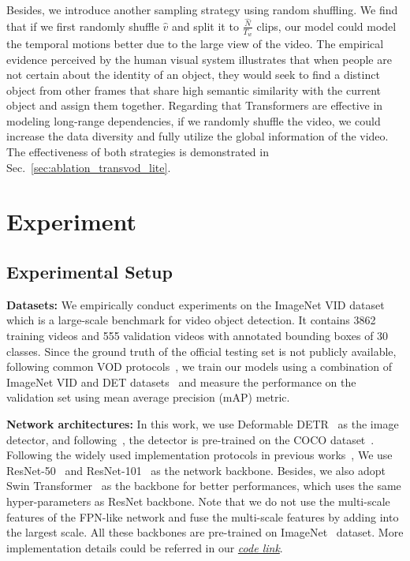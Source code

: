 \documentclass[10pt,journal,compsoc]{IEEEtran}
\begin{document}
Besides, we introduce another sampling strategy using random shuffling.
We find that if we first randomly shuffle $\hat{v}$ and split it to $\frac{\hat{N}}{T_w}$ clips, our model could model the temporal motions better due to the large view of the video. The empirical evidence perceived by the human visual system illustrates that when people are not certain about the identity of an object, they would seek to find a distinct object from other
frames that share high semantic similarity with the current object and assign them together. Regarding that Transformers are effective in modeling long-range dependencies, if we randomly shuffle the video, we could increase the data diversity and fully utilize the global information of the video. The effectiveness of both strategies is demonstrated in Sec.~\ref{sec:ablation_transvod_lite}.



\section{Experiment}


\subsection{Experimental Setup}
\noindent 
\textbf{Datasets:} We empirically conduct experiments on the ImageNet VID dataset~\cite{russakovsky2015imagenet} which is a large-scale benchmark for video object detection. It contains 3862 training videos and 555 validation videos
with annotated bounding boxes of 30 classes. Since the ground truth of the official
testing set is not publicly available, following common VOD protocols~\cite{zhu17fgfa, wang18manet, deng19rdn, wu19selsa}, we train our models using a combination of ImageNet VID and DET datasets~\cite{russakovsky2015imagenet} and measure the performance on the validation set using mean average precision (mAP) metric. 


\noindent
\textbf{Network architectures:} In this work, we use Deformable DETR~\cite{zhu2020deformable} as the image detector, and following~\cite{yao2020video,liu2019looking,qian2020adaptive}, the detector is pre-trained on the COCO dataset~\cite{COCO_dataset}. 
Following the
widely used implementation protocols in previous works~\cite{zhu17fgfa, wang18manet, deng19rdn, wu19selsa}, We use ResNet-50~\cite{he16res} and ResNet-101~\cite{he16res} as the network backbone. Besides, we also adopt Swin Transformer~\cite{liu2021swin} as the backbone 
for better performances, which uses the same hyper-parameters as ResNet backbone. Note that we do not use the  multi-scale features of the FPN-like network and fuse the multi-scale features by adding into the largest scale.
All these backbones are pre-trained on ImageNet~\cite{deng2009imagenet} dataset.
More implementation details could be referred in our \href{https://github.com/SJTU-LuHe/TransVOD}{\textit{code link}}.
\end{document}
